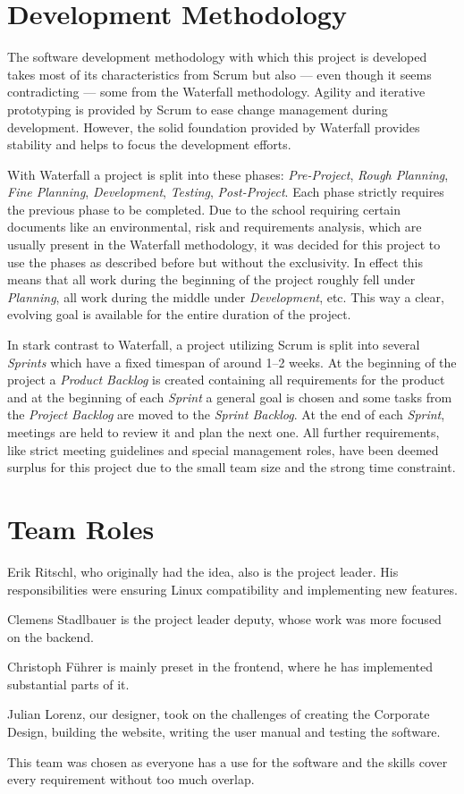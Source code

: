 \section{Development Methodology}
\def\kapitelautor{Clemens Stadlbauer}

The software development methodology with which this project is developed takes
most of its characteristics from Scrum but also --- even though it seems
contradicting --- some from the Waterfall methodology. Agility and iterative
prototyping is provided by Scrum to ease change management during development.
However, the solid foundation provided by Waterfall provides stability and
helps to focus the development efforts.

With Waterfall a project is split into these phases: \emph{Pre-Project},
\emph{Rough Planning}, \emph{Fine Planning}, \emph{Development},
\emph{Testing}, \emph{Post-Project}. Each phase strictly requires the previous
phase to be completed.
Due to the school requiring certain documents like an environmental, risk and
requirements analysis, which are usually present in the Waterfall methodology,
it was decided for this project to use the phases as described before but
without the exclusivity. In effect this means that all work during the
beginning of the project roughly fell under \emph{Planning}, all work during
the middle under \emph{Development}, etc. This way a clear, evolving goal is
available for the entire duration of the project.

In stark contrast to Waterfall, a project utilizing Scrum is split into several
\emph{Sprints} which have a fixed timespan of around 1--2
weeks. At the beginning of the project a \emph{Product Backlog} is created
containing all requirements for the product and at the beginning of each
\emph{Sprint} a general goal is chosen and some tasks from the \emph{Project
Backlog} are moved to the \emph{Sprint Backlog}. At the end of each
\emph{Sprint}, meetings are held to review it and plan the next one.  All
further requirements, like strict meeting guidelines and special management
roles, have been deemed surplus for this project due to the small team size and
the strong time constraint.

\section{Team Roles}
\def\kapitelautor{Clemens Stadlbauer}

Erik Ritschl, who originally had the idea, %
also is the project leader. His responsibilities were ensuring Linux
compatibility and implementing new features.

Clemens Stadlbauer is the project leader deputy, whose work was more focused on
the backend.

Christoph Führer is mainly preset in the frontend, where he has implemented
substantial parts of it.

Julian Lorenz, our designer, took on the challenges of creating the Corporate
Design, building the website, writing the user manual and testing the software.

This team was chosen as everyone has a use for the software and the skills
cover every requirement without too much overlap.
